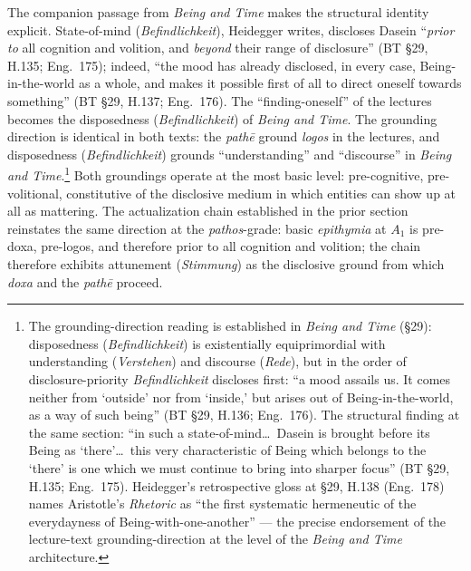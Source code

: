 \documentclass{article}
\begin{document}
 The companion passage from \textit{Being and Time} makes the structural identity explicit. State-of-mind (\textit{Befindlichkeit}), Heidegger writes, discloses Dasein ``\textit{prior to} all cognition and volition, and \textit{beyond} their range of disclosure'' (BT \S29, H.135; Eng.~175); indeed, ``the mood has already disclosed, in every case, Being-in-the-world as a whole, and makes it possible first of all to direct oneself towards something'' (BT \S29, H.137; Eng.~176). The ``finding-oneself'' of the lectures becomes the disposedness (\textit{Befindlichkeit}) of \textit{Being and Time}. The grounding direction is identical in both texts: the \textit{pathē} ground \textit{logos} in the lectures, and disposedness (\textit{Befindlichkeit}) grounds ``understanding'' and ``discourse'' in \textit{Being and Time}.\footnote{The grounding-direction reading is established in \textit{Being and Time} (\S 29): disposedness (\textit{Befindlichkeit}) is existentially equiprimordial with understanding (\textit{Verstehen}) and discourse (\textit{Rede}), but in the order of disclosure-priority \textit{Befindlichkeit} discloses first: ``a mood assails us. It comes neither from `outside' nor from `inside,' but arises out of Being-in-the-world, as a way of such being'' (BT \S 29, H.136; Eng.~176). The structural finding at the same section: ``in such a state-of-mind\ldots\ Dasein is brought before its Being as `there'\ldots\ this very characteristic of Being which belongs to the `there' is one which we must continue to bring into sharper focus'' (BT \S 29, H.135; Eng.~175). Heidegger's retrospective gloss at \S 29, H.138 (Eng.~178) names Aristotle's \textit{Rhetoric} as ``the first systematic hermeneutic of the everydayness of Being-with-one-another'' --- the precise endorsement of the lecture-text grounding-direction at the level of the \textit{Being and Time} architecture.} Both groundings operate at the most basic level: pre-cognitive, pre-volitional, constitutive of the disclosive medium in which entities can show up at all as mattering. The actualization chain established in the prior section reinstates the same direction at the \textit{pathos}-grade: basic \textit{epithymia} at $A_1$ is pre-doxa, pre-logos, and therefore prior to all cognition and volition; the chain therefore exhibits attunement (\textit{Stimmung}) as the disclosive ground from which \textit{doxa} and the \textit{pathē} proceed.
\end{document}
